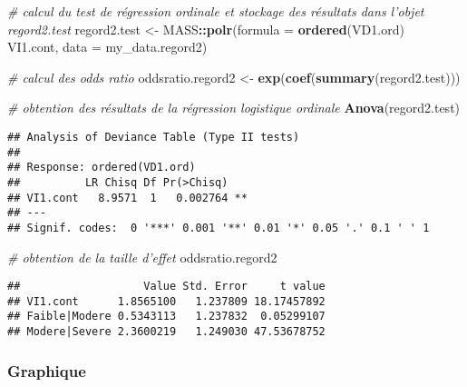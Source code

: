 \documentclass[
]{book}
\newenvironment{Shaded}{\begin{snugshade}}{\end{snugshade}}
\newcommand{\CommentTok}[1]{\textcolor[rgb]{0.56,0.35,0.01}{\textit{#1}}}
\newcommand{\DataTypeTok}[1]{\textcolor[rgb]{0.13,0.29,0.53}{#1}}
\newcommand{\KeywordTok}[1]{\textcolor[rgb]{0.13,0.29,0.53}{\textbf{#1}}}
\newcommand{\NormalTok}[1]{#1}
\newcommand{\OperatorTok}[1]{\textcolor[rgb]{0.81,0.36,0.00}{\textbf{#1}}}
\newcommand{\StringTok}[1]{\textcolor[rgb]{0.31,0.60,0.02}{#1}}
\begin{document}
\begin{Shaded}
\begin{Highlighting}[]
\CommentTok{# calcul du test de régression ordinale et stockage des résultats dans l’objet regord2.test}
\NormalTok{regord2.test <-}\StringTok{ }\NormalTok{MASS}\OperatorTok{::}\KeywordTok{polr}\NormalTok{(}\DataTypeTok{formula =} \KeywordTok{ordered}\NormalTok{(VD1.ord) }\OperatorTok{~}\StringTok{ }\NormalTok{VI1.cont, }
                           \DataTypeTok{data =}\NormalTok{ my_data.regord2)}

\CommentTok{# calcul des odds ratio}
\NormalTok{oddsratio.regord2 <-}\StringTok{ }\KeywordTok{exp}\NormalTok{(}\KeywordTok{coef}\NormalTok{(}\KeywordTok{summary}\NormalTok{(regord2.test)))}

\CommentTok{# obtention des résultats de la régression logistique ordinale}
\KeywordTok{Anova}\NormalTok{(regord2.test)}
\end{Highlighting}
\end{Shaded}

\begin{verbatim}
## Analysis of Deviance Table (Type II tests)
## 
## Response: ordered(VD1.ord)
##          LR Chisq Df Pr(>Chisq)   
## VI1.cont   8.9571  1   0.002764 **
## ---
## Signif. codes:  0 '***' 0.001 '**' 0.01 '*' 0.05 '.' 0.1 ' ' 1
\end{verbatim}

\begin{Shaded}
\begin{Highlighting}[]
\CommentTok{# obtention de la taille d'effet}
\NormalTok{oddsratio.regord2}
\end{Highlighting}
\end{Shaded}

\begin{verbatim}
##                   Value Std. Error     t value
## VI1.cont      1.8565100   1.237809 18.17457892
## Faible|Modere 0.5343113   1.237832  0.05299107
## Modere|Severe 2.3600219   1.249030 47.53678752
\end{verbatim}

\hypertarget{graphique-18}{%
\subsubsection{Graphique}\label{graphique-18}}
\end{document}
